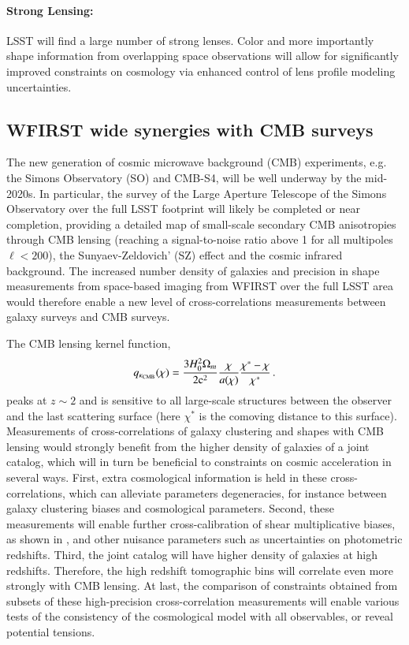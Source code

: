 \documentclass[fleqn,usenatbib,useAMS]{mnras}
\newcommand{\be}{\begin{equation}}
\newcommand{\ee}{\end{equation}}
\begin{document}
\paragraph*{Strong Lensing:} LSST will find a large number of strong lenses. Color and more importantly shape information from overlapping space observations will allow for significantly improved constraints on cosmology via enhanced control of lens profile modeling uncertainties.


\subsection{WFIRST wide synergies with CMB surveys}

The new generation of cosmic microwave background (CMB) experiments, e.g. the Simons Observatory (SO) and CMB-S4, will be well underway by the mid-2020s. In particular, the survey of the Large Aperture Telescope of the Simons Observatory over the full LSST footprint \citep{Ade:2019kq} will likely be completed or near completion, providing a detailed map of small-scale secondary CMB anisotropies through CMB lensing (reaching a signal-to-noise ratio above 1 for all multipoles $\ell<200$), the Sunyaev-Zeldovich' (SZ) effect and the cosmic infrared background. The increased number density of galaxies and precision in shape measurements from space-based imaging from WFIRST over the full LSST area would therefore enable a new level of cross-correlations measurements between galaxy surveys and CMB surveys.

The CMB lensing kernel function,
\be
\label{eq:qkappa}
q_{\kappa_{\rm CMB}}(\chi) = \frac{3 H_0^2 \Omega_m }{2 \mathrm{c}^2}\frac{\chi}{a(\chi)}  \frac{\chi^*-\chi}{\chi^*} \,.
\ee
peaks at $z\sim2$ and is sensitive to all large-scale structures between the observer and the last scattering surface (here $\chi^*$ is the comoving distance to this surface).
Measurements of cross-correlations of galaxy clustering and shapes with CMB lensing would strongly benefit from the higher density of galaxies of a joint catalog, which will in turn be beneficial to constraints on cosmic acceleration in several ways.
First, extra cosmological information is held in these cross-correlations, which can alleviate parameters degeneracies, for instance between galaxy clustering biases and cosmological parameters. Second, these measurements will enable further cross-calibration of shear multiplicative biases, as shown in \cite{ske17}, and other nuisance parameters such as uncertainties on photometric redshifts. Third, the joint catalog will have higher density of galaxies at high redshifts. Therefore, the high redshift tomographic bins will correlate even more strongly with CMB lensing. At last, the comparison of constraints obtained from subsets of these high-precision cross-correlation measurements will enable various tests of the consistency of the cosmological model with all observables, or reveal potential tensions.
\end{document}
